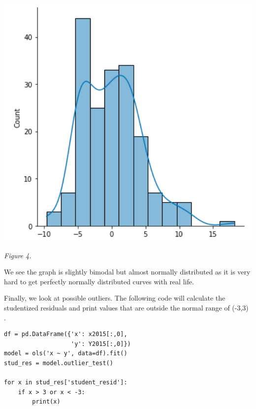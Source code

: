 \documentclass[12pt]{article}
\begin{document}
\begin{center}
    \includegraphics[width=6in]{Figures/figure4.png}\\
\end{center}

\begin{center}
\textit{Figure 4.}
\end{center}

\vspace{15pt}

\noindent
We see the graph is slightly bimodal but almost normally distributed as it is very hard to get perfectly normally distributed curves with real life.

\vspace{15pt}

\noindent
Finally, we look at possible outliers. The following code will calculate the studentized residuals and print values that are outside the normal range of (-3,3) \citep{statologyresiduals}.

\begin{lstlisting}
df = pd.DataFrame({'x': x2015[:,0],
                   'y': Y2015[:,0]})
model = ols('x ~ y', data=df).fit()
stud_res = model.outlier_test()

for x in stud_res['student_resid']:
    if x > 3 or x < -3:
        print(x)
\end{lstlisting}
\end{document}
